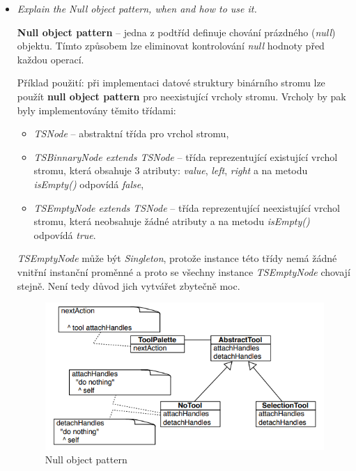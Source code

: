 \documentclass{szzclass}
\begin{document}
\begin{itemize}
      \item \textit{Explain the Null object pattern, when and how to use it.}
      
      \textbf{Null object pattern} -- jedna z podtříd definuje chování prázdného (\textit{null}) objektu.
      Tímto způsobem lze eliminovat kontrolování \textit{null} hodnoty před každou operací.

      Příklad použití: při implementaci datové struktury binárního stromu lze použít \textbf{null object pattern}
      pro neexistující vrcholy stromu. Vrcholy by pak byly implementovány těmito třídami:

      \begin{itemize}
            \item \textit{TSNode} -- abstraktní třída pro vrchol stromu,
            
            \item \textit{TSBinnaryNode extends TSNode} -- třída reprezentující existující vrchol stromu,
            která obsahuje 3 atributy: \textit{value}, \textit{left}, \textit{right} a na metodu
            \textit{isEmpty()} odpovídá \textit{false},
            
            \item \textit{TSEmptyNode extends TSNode} -- třída reprezentující neexistující vrchol stromu,
            která neobsahuje žádné atributy a na metodu
            \textit{isEmpty()} odpovídá \textit{true}.
            
      \end{itemize}

      \textit{TSEmptyNode} může být \textit{Singleton}, protože instance této třídy nemá žádné vnitřní
      instanční proměnné a proto se všechny instance \textit{TSEmptyNode} chovají stejně. Není tedy důvod
      jich vytvářet zbytečně moc.
      
      \begin{figure}[h]
            \centering
            \includegraphics[width=1\textwidth]{topics/bi-wsi-si-10/null.png}
            \caption{Null object pattern}
      \end{figure}


\end{itemize}
\end{document}
